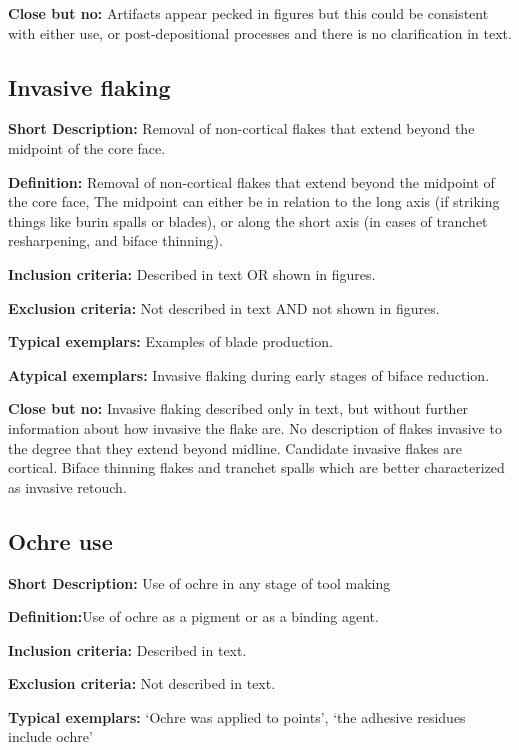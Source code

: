 \documentclass[
]{article}
\begin{document}
\textbf{Close but no:} Artifacts appear pecked in figures but this could
be consistent with either use, or post-depositional processes and there
is no clarification in text.

\hypertarget{invasive-flaking}{%
\subsection{Invasive flaking}\label{invasive-flaking}}

\textbf{Short Description:} Removal of non-cortical flakes that extend
beyond the midpoint of the core face.

\textbf{Definition:} Removal of non-cortical flakes that extend beyond
the midpoint of the core face, The midpoint can either be in relation to
the long axis (if striking things like burin spalls or blades), or along
the short axis (in cases of tranchet resharpening, and biface thinning).

\textbf{Inclusion criteria:} Described in text OR shown in figures.

\textbf{Exclusion criteria:} Not described in text AND not shown in
figures.

\textbf{Typical exemplars:} Examples of blade production.

\textbf{Atypical exemplars:} Invasive flaking during early stages of
biface reduction.

\textbf{Close but no:} Invasive flaking described only in text, but
without further information about how invasive the flake are. No
description of flakes invasive to the degree that they extend beyond
midline. Candidate invasive flakes are cortical. Biface thinning flakes
and tranchet spalls which are better characterized as invasive retouch.

\hypertarget{ochre-use}{%
\subsection{Ochre use}\label{ochre-use}}

\textbf{Short Description:} Use of ochre in any stage of tool making

\textbf{Definition:}Use of ochre as a pigment or as a binding agent.

\textbf{Inclusion criteria:} Described in text.

\textbf{Exclusion criteria:} Not described in text.

\textbf{Typical exemplars:} `Ochre was applied to points', `the adhesive
residues include ochre'
\end{document}
